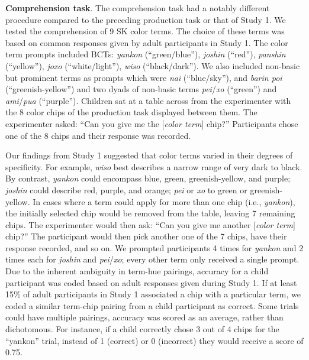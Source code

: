 \documentclass[
  english,
  ,man,floatsintext]{apa6}
\begin{document}
\textbf{Comprehension task}. The comprehension task had a notably different procedure compared to the preceding production task or that of Study 1. We tested the comprehension of 9 SK color terms. The choice of these terms was based on common responses given by adult participants in Study 1. The color term prompts included BCTs: \emph{yankon} (\enquote{green/blue}), \emph{joshin} (\enquote{red}), \emph{panshin} (\enquote{yellow}), \emph{joxo} (\enquote{white/light}), \emph{wiso} (\enquote{black/dark}). We also included non-basic but prominent terms as prompts which were \emph{nai} (\enquote{blue/sky}), and \emph{barin poi} (\enquote{greenish-yellow}) and two dyads of non-basic terms \emph{pei}/\emph{xo} (\enquote{green}) and \emph{ami}/\emph{pua} (\enquote{purple}). Children sat at a table across from the experimenter with the 8 color chips of the production task displayed between them. The experimenter asked: \enquote{Can you give me the {[}\emph{color term}{]} chip?} Participants chose one of the 8 chips and their response was recorded.

Our findings from Study 1 suggested that color terms varied in their degrees of specificity. For example, \emph{wiso} best describes a narrow range of very dark to black. By contrast, \emph{yankon} could encompass blue, green, greenish-yellow, and purple; \emph{joshin} could describe red, purple, and orange; \emph{pei} or \emph{xo} to green or greenish-yellow. In cases where a term could apply for more than one chip (i.e., \emph{yankon}), the initially selected chip would be removed from the table, leaving 7 remaining chips. The experimenter would then ask: \enquote{Can you give me another {[}\emph{color term}{]} chip?} The participant would then pick another one of the 7 chips, have their response recorded, and so on. We prompted participants 4 times for \emph{yankon} and 2 times each for \emph{joshin} and \emph{pei}/\emph{xo}; every other term only received a single prompt. Due to the inherent ambiguity in term-hue pairings, accuracy for a child participant was coded based on adult responses given during Study 1. If at least 15\% of adult participants in Study 1 associated a chip with a particular term, we coded a similar term-chip pairing from a child participant as correct. Some trials could have multiple pairings, accuracy was scored as an average, rather than dichotomous. For instance, if a child correctly chose 3 out of 4 chips for the \enquote{yankon} trial, instead of 1 (correct) or 0 (incorrect) they would receive a score of 0.75.
\end{document}
